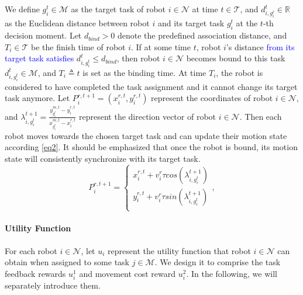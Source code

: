 \documentclass[lettersize,journal]{IEEEtran}
\newcommand{\blue}[1]{\textcolor{blue}{#1}}
\begin{document}
We define $g_i^t\in\mathcal{M}$ as the target task of robot $i\in\mathcal{N}$ at time $t\in\mathcal{T}$, and $d_{i,g_i^t}^t\in\mathbb{R}$ as the Euclidean distance between robot $i$ and its target task $g_i^t$ at the $t$-th decision moment. Let  $d_{bind}>0$ denote the predefined association distance,  and $T_i\in\mathcal{T}$ be the finish time of robot $i$. If at some time $t$, robot $i$'s distance \blue{from its target task satisfies}  $d_{i,g_i^{t}}^t\le d_{bind}$, then robot $i\in\mathcal{N}$ becomes bound to this task $d_{i,g_i^{t}}^t\in\mathcal{M}$, and $T_i\triangleq t$ is set as the binding time. At time $T_i$, the robot is considered to have completed the task assignment and it cannot change its target task anymore. Let $P_i^{r,t+1}=\left(x_i^{r,t},y_i^{r,t}\right)$ represent the coordinates of robot $i\in\mathcal{N}$,   and $\lambda_{i,g_i^t}^{t+1}=\frac{y_{g_i^t}^{m,t}-y_i^{r,t}}{x_{g_i^t}^{m,t}-x_i^{r,t}}$ represent the direction vector of robot $i\in\mathcal{N}$. Then each robot moves towards  the chosen target task and can update their motion state according \eqref{eq2}. It should be emphasized that once the robot is bound, its motion state will consistently synchronize with its target task. 
\begin{equation}
P_i^{r,t+1}=\left\{\begin{matrix}x_i^{r,t}+v_i^r\tau cos\left(\lambda_{i,g_i^t}^{t+1}\right)\\y_i^{r,t}+v_i^r\tau sin\left(\lambda_{i,g_i^t}^{t+1}\right)\\\end{matrix}\right. ,\label{eq2}
\end{equation}

\paragraph{\textbf{Utility Function}}For each robot $i\in\mathcal{N}$, let
 $u_i$ represent the utility function that robot $i\in\mathcal{N}$ can obtain when assigned to some task  $j\in\mathcal{M}$. We design it to comprise the task feedback rewards $u_i^1$ and movement cost reward $u_i^2$. In the following, we will separately introduce them.
\end{document}
